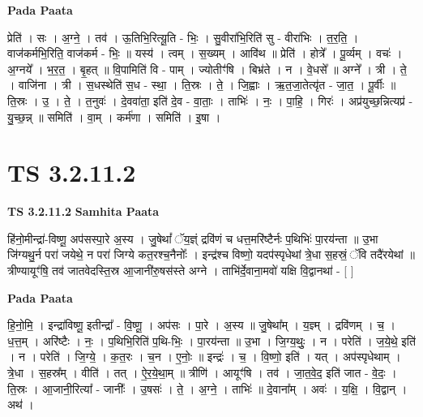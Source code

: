 \documentclass[17pt]{extarticle}
\begin{document}
\textbf{Pada Paata} \newline

प्रेति॑ । सः । अ॒ग्ने॒ । तव॑ । ऊ॒तिभि॒रित्यू॒ति - भिः॒ । सु॒वीरा॑भि॒रिति॑ सु - वीरा॑भिः । त॒र॒ति॒ । वाज॑कर्मभि॒रिति॒ वाज॑कर्म - भिः॒ ॥ यस्य॑ । त्वम् । स॒ख्यम् । आवि॑थ ॥ प्रेति॑ । होत्रे᳚ । पू॒र्व्यम् । वचः॑ । अ॒ग्नये᳚ । भ॒र॒त॒ । बृ॒हत् ॥ वि॒पामिति॑ वि - पाम् । ज्योतीꣳ॑षि । बिभ्र॑ते । न । वे॒धसे᳚ ॥ अग्ने᳚ । त्री । ते॒ । वाजि॑ना । त्री । स॒धस्थेति॑ स॒ध - स्था॒ । ति॒स्रः । ते॒ । जि॒ह्वाः । ऋ॒त॒जा॒तेत्यृ॑त - जा॒त॒ । पू॒र्वीः ॥ ति॒स्रः । उ॒ । ते॒ । त॒नुवः॑ । दे॒ववा॑ता॒ इति॑ दे॒व - वा॒ताः॒ । ताभिः॑ । नः॒ । पा॒हि॒ । गिरः॑ । अप्र॑युच्छ॒न्नित्यप्र॑ - यु॒च्छ॒न्न् ॥ समिति॑ । वा॒म् । कर्म॑णा । समिति॑ । इ॒षा ।  \newline




\section*{ TS 3.2.11.2 }

\textbf{TS 3.2.11.2 } \newline
\textbf{Samhita Paata} \newline

हि॑नो॒मीन्द्रा॑-विष्णू॒ अप॑सस्पा॒रे अ॒स्य । जु॒षेथां᳚ ॅय॒ज्ञ्ं द्रवि॑णं च धत्त॒मरि॑ष्टैर्नः प॒थिभिः॑ पा॒रय॑न्ता ॥ उ॒भा जि॑ग्यथु॒र्न परा॑ जयेथे॒ न परा॑ जिग्ये कत॒रश्च॒नैनोः᳚ । इन्द्र॑श्च विष्णो॒ यदप॑स्पृधेथां त्रे॒धा स॒हस्रं॒ ॅवि तदै॑रयेथां ॥ त्रीण्यायूꣳ॑षि॒ तव॑ जातवेदस्ति॒स्र आ॒जानी॑रु॒षस॑स्ते अग्ने । ताभि॑र्दे॒वाना॒मवो॑ यक्षि वि॒द्वानथा॑ - [  ] \newline

\textbf{Pada Paata} \newline

हि॒नो॒मि॒ । इन्द्रा॑विष्णू॒ इतीन्द्रा᳚ - वि॒ष्णू॒ । अप॑सः । पा॒रे । अ॒स्य ॥ जु॒षेथा᳚म् । य॒ज्ञ्म् । द्रवि॑णम् । च॒ । ध॒त्त॒म् । अरि॑ष्टैः । नः॒ । प॒थिभि॒रिति॑ प॒थि-भिः॒ । पा॒रय॑न्ता ॥ उ॒भा । जि॒ग्य॒थुः॒ । न । परेति॑ । ज॒ये॒थे॒ इति॑ । न । परेति॑ । जि॒ग्ये॒ । क॒त॒रः । च॒न । ए॒नोः॒ ॥ इन्द्रः॑ । च॒ । वि॒ष्णो॒ इति॑ । यत् । अप॑स्पृधेथाम् । त्रे॒धा । स॒हस्र᳚म् । वीति॑ । तत् । ऐ॒र॒ये॒था॒म् ॥ त्रीणि॑ । आयूꣳ॑षि । तव॑ । जा॒त॒वे॒द॒ इति॑ जात - वे॒दः॒ । ति॒स्रः । आ॒जानी॒रित्या᳚ - जानीः᳚ । उ॒षसः॑ । ते॒ । अ॒ग्ने॒ । ताभिः॑ ॥ दे॒वाना᳚म् । अवः॑ । य॒क्षि॒ । वि॒द्वान् । अथ॑ ।  \newline
\end{document}
